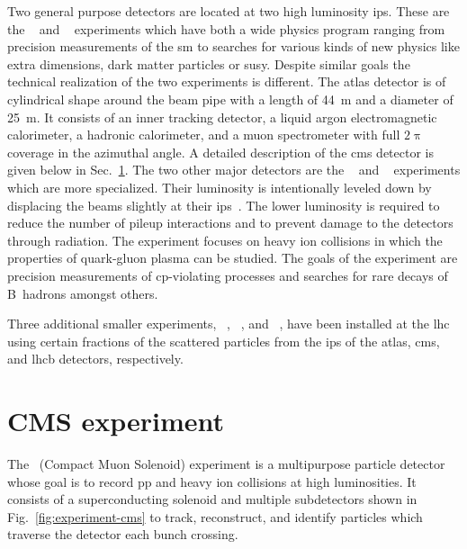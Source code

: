 Two general purpose detectors are located at two high luminosity \glspl{ip}. These are the ~\cite{Aad:2008zzm} and ~\cite{Chatrchyan:2008aa} experiments which have both a wide physics program ranging from precision measurements of the \gls{sm} to searches for various kinds of new physics like extra dimensions, dark matter particles or \gls{susy}. Despite similar goals the technical realization of the two experiments is different. The \gls{atlas} detector is of cylindrical shape around the beam pipe with a length of 44~m and a diameter of 25~m. It consists of an inner tracking detector, a liquid argon electromagnetic calorimeter, a hadronic calorimeter, and a muon spectrometer with full $2\uppi$ coverage in the azimuthal angle. A detailed description of the \gls{cms} detector is given below in Sec.~\ref{sec:experiment-cms}. The two other major detectors are the ~\cite{Aamodt:2008zz} and ~\cite{Alves:2008zz} experiments which are more specialized. Their luminosity is intentionally leveled down by displacing the beams slightly at their \glspl{ip}~\cite{Follin:1955354}. The lower luminosity is required to reduce the number of pileup interactions and to prevent damage to the detectors through radiation. The  experiment focuses on heavy ion collisions in which the properties of quark-gluon plasma can be studied. The goals of the  experiment are precision measurements of \gls{cp}-violating processes and searches for rare decays of B~hadrons amongst others.

Three additional smaller experiments, ~\cite{Adriani:2008zz}, ~\cite{Anelli:2008zza}, and ~\cite{Pinfold:2009oia}, have been installed at the \gls{lhc} using certain fractions of the scattered particles from the \glspl{ip} of the \gls{atlas}, \gls{cms}, and \gls{lhcb} detectors, respectively. 


\section{CMS experiment}
\label{sec:experiment-cms}

The ~(Compact Muon Solenoid) experiment is a multipurpose particle detector whose goal is to record \gls{pp} and heavy ion collisions at high luminosities. It consists of a superconducting solenoid and multiple subdetectors shown in Fig.~\ref{fig:experiment-cms} to track, reconstruct, and identify particles which traverse the detector each bunch crossing.


